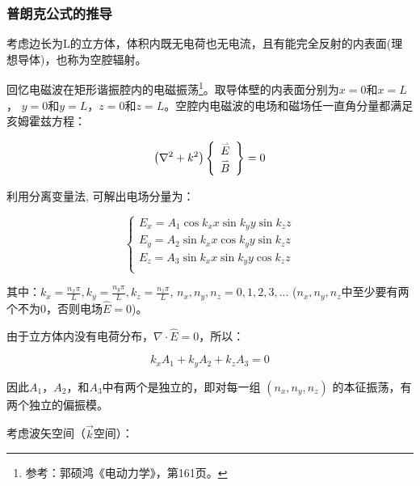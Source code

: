 \subsubsection{普朗克公式的推导}

考虑边长为L的立方体，体积内既无电荷也无电流，且有能完全反射的内表面(理想导体)，也称为空腔辐射。

回忆电磁波在矩形谐振腔内的电磁振荡\footnote{参考：郭硕鸿《电动力学》，第161页。}。取导体壁的内表面分别为$x=0$和$x=L$，
$y=0$和$y=L$，$z=0$和$z=L$。空腔内电磁波的电场和磁场任一直角分量都满足亥姆霍兹方程：

\begin{equation}
\left( {\nabla ^2  + k^2 } \right)\left\{ {\begin{array}{*{20}c}
   {\mathord{\buildrel{\lower3pt\hbox{$\scriptscriptstyle\rightharpoonup$}}
\over E} }  \\
   {\mathord{\buildrel{\lower3pt\hbox{$\scriptscriptstyle\rightharpoonup$}}
\over B} }  \\
\end{array}} \right\} = 0
\end{equation}

利用分离变量法, 可解出电场分量为：


\begin{equation}
\left\{ \begin{array}{l}
 E_x  = A_1 \cos k_x x\sin k_y y\sin k_z z \\
 E_y  = A_2 \sin k_x x\cos k_y y\sin k_z z \\
 E_z  = A_3 \sin k_x x\sin k_y y\cos k_z z \\
 \end{array} \right.
\end{equation}

其中：$k_x  = \frac{{n_x \pi }}{L},k_y  = \frac{{n_y \pi }}{L},k_z =
\frac{{n_z \pi }}{L}$, $n_x ,n_y ,n_z  = 0,1,2,3,...$ ($n_x ,n_y
,n_z$中至少要有两个不为0，否则电场$\hat E = 0$)。

由于立方体内没有电荷分布，$\nabla \cdot \hat E =0$，所以：

\begin{equation}
k_x A_1 + k_y A_2 + k_z A_3 = 0
\end{equation}

因此$A_1$，$A_2$，和$A_3$中有两个是独立的，即对每一组 $(n_x, n_y,
n_z)$ 的本征振荡，有两个独立的偏振模。

考虑波矢空间（$\vec k$空间）：

